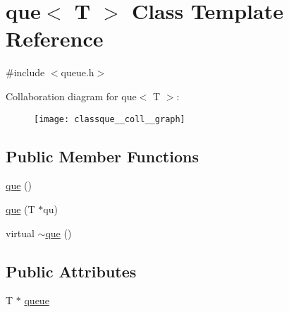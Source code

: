 \hypertarget{classque}{\section{que$<$ T $>$ Class Template Reference}
\label{classque}
}


{\ttfamily \#include $<$queue.\+h$>$}



Collaboration diagram for que$<$ T $>$\+:
\nopagebreak
\begin{figure}[H]
\begin{center}
\leavevmode
\texttt{[image: classque\_\_coll\_\_graph]}
\end{center}
\end{figure}
\subsection*{Public Member Functions}
\begin{DoxyCompactItemize}
\item 
\hyperlink{classque_a238b3041fa36ddc5b657c0ba45d3e0a8}{que} ()
\item 
\hyperlink{classque_a5ec69ddb4a0ee110e9c46447af8f440d}{que} (T $\ast$qu)
\item 
virtual \hyperlink{classque_a766b884d9b0cdad120b0e2d9e6479804}{$\sim$que} ()
\end{DoxyCompactItemize}
\subsection*{Public Attributes}
\begin{DoxyCompactItemize}
\item 
T $\ast$ \hyperlink{classque_a13f6349aa25df1e706a9b8b5ef69993c}{queue}
\end{DoxyCompactItemize}



